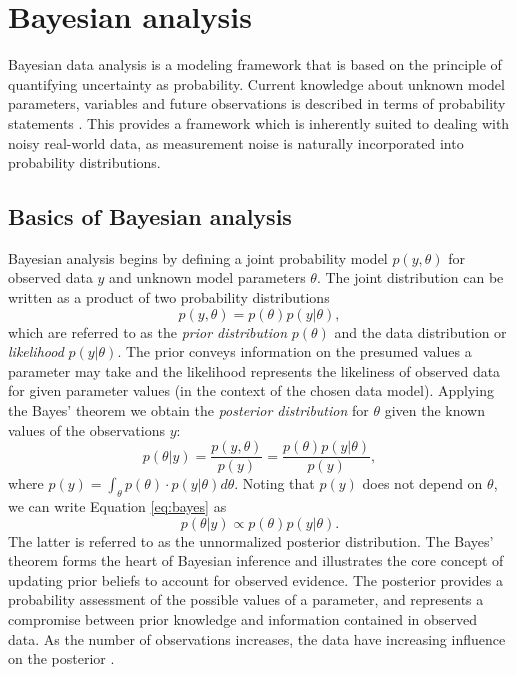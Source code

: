 
\section{Bayesian analysis}\label{bayesian-analysis}

Bayesian data analysis is a modeling framework that is based on the principle
of quantifying uncertainty as probability. Current knowledge about unknown
model parameters, variables and future observations is described in terms of
probability statements \citep{Gelman2013}. This provides a framework which
is inherently suited to dealing with noisy real-world data, as measurement
noise is naturally incorporated into probability distributions.

\subsection{Basics of Bayesian analysis}

Bayesian analysis begins by defining a joint probability model $p(y,\theta)$
for observed data $y$ and unknown model parameters $\theta$.
The joint distribution can be written as a product of two probability distributions
\begin{equation}
  p(y,\theta) = p(\theta) p(y|\theta),
\end{equation}
which are referred to as the \emph{prior distribution} $p(\theta)$ and the
data distribution or \emph{likelihood} $p(y|\theta)$. The prior conveys
information on the presumed values a parameter may take and the likelihood
represents the likeliness of observed data for given parameter values (in the
context of the chosen data model). Applying the Bayes' theorem we obtain the
\emph{posterior distribution} for $\theta$ given the known values of the
observations $y$:
\begin{equation}
  \label{eq:bayes}
  p(\theta|y) = \frac{p(y,\theta)}{p(y)} = \frac{p(\theta) p(y|\theta)}{p(y)},
\end{equation}
where $p(y) = \int_{\theta} p(\theta) \cdot p(y|\theta) d\theta$.
Noting that $p(y)$ does not depend on $\theta$, we can write Equation
\ref{eq:bayes} as
\begin{equation}
  p(\theta|y) \propto p(\theta) p(y|\theta).
\end{equation}
The latter is referred to as the unnormalized posterior distribution. The
Bayes' theorem forms the heart of Bayesian inference and illustrates the core
concept of updating prior beliefs to account for observed evidence. The
posterior provides a probability assessment of the possible values of
a parameter, and represents a compromise between prior knowledge and information
contained in observed data. As the number of observations increases, the
data have increasing influence on the posterior \citep{Gelman2013}.

